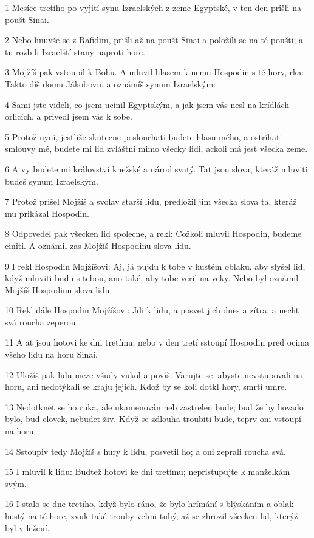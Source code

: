 \par 1 Mesíce tretího po vyjití synu Izraelských z zeme Egyptské, v ten den prišli na poušt Sinai.
\par 2 Nebo hnuvše se z Rafidim, prišli až na poušt Sinai a položili se na té poušti; a tu rozbili Izraelští stany naproti hore.
\par 3 Mojžíš pak vstoupil k Bohu. A mluvil hlasem k nemu Hospodin s té hory, rka: Takto díš domu Jákobovu, a oznámíš synum Izraelským:
\par 4 Sami jste videli, co jsem ucinil Egyptským, a jak jsem vás nesl na krídlách orlicích, a privedl jsem vás k sobe.
\par 5 Protož nyní, jestliže skutecne poslouchati budete hlasu mého, a ostríhati smlouvy mé, budete mi lid zvláštní mimo všecky lidi, ackoli má jest všecka zeme.
\par 6 A vy budete mi království knežské a národ svatý. Tat jsou slova, kteráž mluviti budeš synum Izraelským.
\par 7 Protož prišel Mojžíš a svolav starší lidu, predložil jim všecka slova ta, kteráž mu prikázal Hospodin.
\par 8 Odpovedel pak všecken lid spolecne, a rekl: Cožkoli mluvil Hospodin, budeme ciniti. A oznámil zas Mojžíš Hospodinu slova lidu.
\par 9 I rekl Hospodin Mojžíšovi: Aj, já pujdu k tobe v hustém oblaku, aby slyšel lid, když mluviti budu s tebou, ano také, aby tobe veril na veky. Nebo byl oznámil Mojžíš Hospodinu slova lidu.
\par 10 Rekl dále Hospodin Mojžíšovi: Jdi k lidu, a posvet jich dnes a zítra; a necht svá roucha zeperou.
\par 11 A at jsou hotovi ke dni tretímu, nebo v den tretí sstoupí Hospodin pred ocima všeho lidu na horu Sinai.
\par 12 Uložíš pak lidu meze všudy vukol a povíš: Varujte se, abyste nevstupovali na horu, ani nedotýkali se kraju jejích. Kdož by se koli dotkl hory, smrtí umre.
\par 13 Nedotknet se ho ruka, ale ukamenován neb zastrelen bude; bud že by hovado bylo, bud clovek, nebudet živ. Když se zdlouha troubiti bude, teprv oni vstoupí na horu.
\par 14 Sstoupiv tedy Mojžíš s hury k lidu, posvetil ho; a oni zeprali roucha svá.
\par 15 I mluvil k lidu: Budtež hotovi ke dni tretímu; nepristupujte k manželkám svým.
\par 16 I stalo se dne tretího, když bylo ráno, že bylo hrímání s blýskáním a oblak hustý na té hore, zvuk také trouby velmi tuhý, až se zhrozil všecken lid, kterýž byl v ležení.
